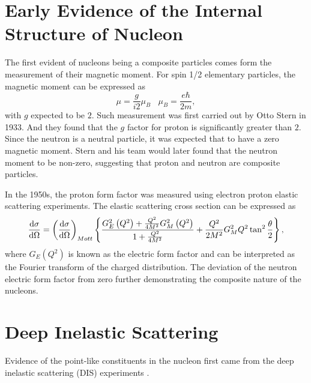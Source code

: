 \section {Early Evidence of the Internal Structure of Nucleon}
The first evident of nucleons being a composite particles comes form the 
measurement of their magnetic moment. For spin 1/2 elementary particles, the 
magnetic moment can be expressed as 
\begin{equation}
\mu = \frac{g}{i2}\mu_B ~~~~ \mu_B = \frac{e\hbar}{2m},
\end{equation}
with $g$ expected to be $2$. Such measurement was first carried out by Otto 
Stern in 1933. And they found that the $g$ factor for proton is significantly 
greater than $2$. Since the neutron is a neutral particle, it was expected that
to have a zero magnetic moment. Stern and his team would later found that the 
neutron moment to be non-zero, suggesting that proton and neutron are composite
particles.

In the 1950s, the proton form factor was measured using electron proton elastic
scattering experiments\cite{hofstadter1956}. The elastic scattering cross 
section can be expressed as 
\begin{equation}
\dv{\sigma}{\Omega} = \left(\dv{\sigma}{\Omega}\right)_{Mott}\left\{ 
	\frac{G_E^2\left(Q^2\right) + \frac{Q^2}{4M^2}G_M^2 \left(Q^2\right)}
	{1 + \frac{Q^2}{4M^2}} + \frac{Q^2}{2M^2} G^2_M{Q^2}\tan^2\frac{\theta}{2}
	\right\},
\end{equation}
where $G_E\left(Q^2\right)$ is known as the electric form factor and can be 
interpreted as the Fourier transform of the charged distribution. The deviation
of the neutron electric form factor from zero further demonstrating the 
composite nature of the nucleons.

\section {Deep Inelastic Scattering}
\label{sec:dis}
Evidence of the point-like constituents in the nucleon first came from the deep
inelastic scattering (DIS) experiments \cite{breidenbach1969}. 


